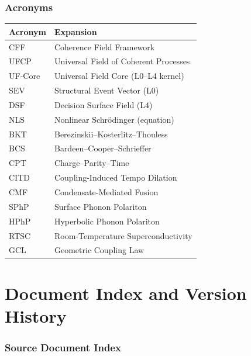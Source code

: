 \documentclass[11pt, a4paper]{article}
\begin{document}
\section{Acronyms}

\begin{center}
\begin{tabular}{@{}ll@{}}
\toprule
\textbf{Acronym} & \textbf{Expansion} \\
\midrule
CFF & Coherence Field Framework \\
UFCP & Universal Field of Coherent Processes \\
UF-Core & Universal Field Core (L0--L4 kernel) \\
SEV & Structural Event Vector (L0) \\
DSF & Decision Surface Field (L4) \\
NLS & Nonlinear Schr\"odinger (equation) \\
BKT & Berezinskii--Kosterlitz--Thouless \\
BCS & Bardeen--Cooper--Schrieffer \\
CPT & Charge--Parity--Time \\
CITD & Coupling-Induced Tempo Dilation \\
CMF & Condensate-Mediated Fusion \\
SPhP & Surface Phonon Polariton \\
HPhP & Hyperbolic Phonon Polariton \\
RTSC & Room-Temperature Superconductivity \\
GCL & Geometric Coupling Law \\
\bottomrule
\end{tabular}
\end{center}

\newpage

\part{Document Index and Version History}

\section{Source Document Index}
\end{document}
